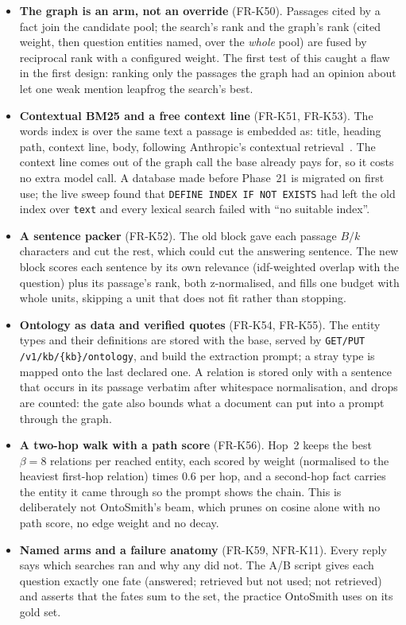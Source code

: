 \begin{itemize}
\item \textbf{The graph is an arm, not an override} (FR-K50). Passages cited by a fact join the candidate pool; the search's rank and the graph's rank
  (cited weight, then question entities named, over the \emph{whole} pool) are fused by reciprocal rank with a configured weight. The first test of this
  caught a flaw in the first design: ranking only the passages the graph had an opinion about let one weak mention leapfrog the search's best.
\item \textbf{Contextual BM25 and a free context line} (FR-K51, FR-K53). The words index is over the same text a passage is embedded as: title, heading
  path, context line, body, following Anthropic's contextual retrieval~\cite{anthropic2024contextual}. The context line comes out of the graph call the base
  already pays for, so it costs no extra model call. A database made before Phase~21 is migrated on first use; the live sweep found that
  \texttt{DEFINE INDEX IF NOT EXISTS} had left the old index over \texttt{text} and every lexical search failed with ``no suitable index''.
\item \textbf{A sentence packer} (FR-K52). The old block gave each passage $B/k$ characters and cut the rest, which could cut the answering sentence. The
  new block scores each sentence by its own relevance (idf-weighted overlap with the question) plus its passage's rank, both z-normalised, and fills one
  budget with whole units, skipping a unit that does not fit rather than stopping.
\item \textbf{Ontology as data and verified quotes} (FR-K54, FR-K55). The entity types and their definitions are stored with the base, served by
  \texttt{GET/PUT /v1/kb/\{kb\}/ontology}, and build the extraction prompt; a stray type is mapped onto the last declared one. A relation is stored only with
  a sentence that occurs in its passage verbatim after whitespace normalisation, and drops are counted: the gate also bounds what a document can put into a
  prompt through the graph.
\item \textbf{A two-hop walk with a path score} (FR-K56). Hop~2 keeps the best $\beta{=}8$ relations per reached entity, each scored by weight
  (normalised to the heaviest first-hop relation) times $0.6$ per hop, and a second-hop fact carries the entity it came through so the prompt shows the
  chain. This is deliberately not OntoSmith's beam, which prunes on cosine alone with no path score, no edge weight and no decay.
\item \textbf{Named arms and a failure anatomy} (FR-K59, NFR-K11). Every reply says which searches ran and why any did not. The A/B script gives each
  question exactly one fate (answered; retrieved but not used; not retrieved) and asserts that the fates sum to the set, the practice OntoSmith uses on its
  gold set.
\end{itemize}

